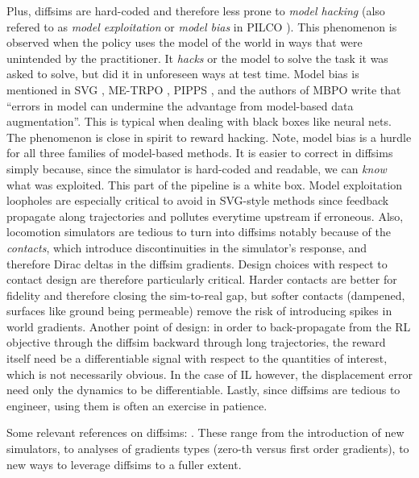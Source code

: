 \documentclass[12pt,a4paper]{article}
\begin{document}
Plus, diffsims are hard-coded and therefore less prone to \textit{model hacking} (also refered
to as \textit{model exploitation} \cite{Ross2012-yj}
or \textit{model bias} in PILCO \cite{Deisenroth2011-ya}).
This phenomenon is observed when the policy uses the model of the world in ways that were
unintended by the practitioner. It \textit{hacks} or  the model to solve the task
it was asked to solve, but did it in unforeseen ways at test time.
Model bias is mentioned in SVG \cite{Heess2015-va}, ME-TRPO \cite{Kurutach2018-lw},
PIPPS \cite{Parmas2018-se}, and the authors of MBPO \cite{Janner2019-sk} write that
``errors in model can undermine the advantage from model-based data augmentation''.
This is typical when dealing with black boxes like neural nets.
The phenomenon is close in spirit to reward hacking.
Note, model bias is a hurdle for all three families of model-based methods.
It is easier to correct in diffsims simply because, since the simulator is hard-coded and readable,
we can \textit{know} what was exploited. This part of the pipeline is a white box.
Model exploitation loopholes are especially critical to avoid in SVG-style methods since
feedback propagate along trajectories and pollutes everytime upstream if erroneous.
Also, locomotion simulators are tedious to turn into diffsims notably because of the
\emph{contacts}, which introduce discontinuities in the simulator's response, and therefore
Dirac deltas in the diffsim gradients.
Design choices with respect to contact design are therefore particularly critical.
Harder contacts are better for fidelity and therefore closing the sim-to-real gap,
but softer contacts (dampened, surfaces like ground being permeable) remove the risk of introducing
spikes in world gradients.
Another point of design: in order to back-propagate from the RL objective through the diffsim
backward through long trajectories, the reward itself need be a differentiable signal
with respect to the quantities of interest, which is not necessarily obvious.
In the case of IL however, the displacement error need only the dynamics to be differentiable.
Lastly, since diffsims are tedious to engineer, using them is often an exercise in patience.

Some relevant references on diffsims:
\cite{Degrave2016-vr, Hu2019-ax, Falisse2019-ge, Hu2020-eb, Qiao2020-um, Gradu2020-kq,
Geilinger2020-ar, Mora2021-pp, Heiden2021-fb, Clarke2021-rr, Werling2021-da, Qiao2021-zn,
Huang2021-le, Heiden2021-ey, Grinsztajn2021-mr, Daniel_Freeman2021-az, Lin2022-jr, Xu2022-bz,
Suh2022-mn, Allen2022-vc, Chen2022-zd, Ren2023-yc, Georgiev2024-rs}.
These range from the introduction of new simulators, to analyses of gradients types
(zero-th versus first order gradients), to new ways to leverage diffsims to a fuller extent.
\end{document}
